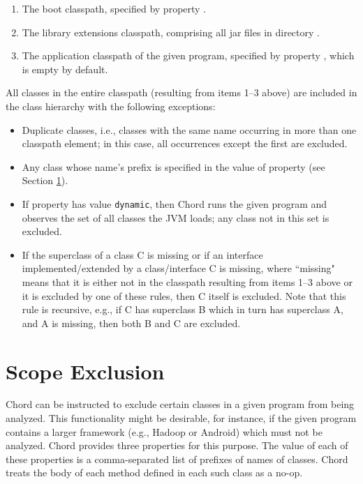 \begin{enumerate}
\item
The boot classpath, specified by property .
\item
The library extensions classpath, comprising all jar files in
directory .
\item
The application classpath of the given program, specified by property ,
which is empty by default.
\end{enumerate}

All classes in the entire classpath (resulting from items 1--3 above)
are included in the class hierarchy with the following exceptions:
\begin{itemize}
\item
Duplicate classes, i.e., classes with the same name occurring in more
than one classpath element; in this case, all occurrences except the
first are excluded.
\item
Any class whose name's prefix is specified in the value of property
 (see Section \ref{sec:scope-exclude}).
\item
If property  has value {\tt dynamic}, then
Chord runs the given program and observes the set of all classes the
JVM loads; any class not in this set is excluded.
\item
If the superclass of a class C is missing or if an interface
implemented/extended by a class/interface C is missing, where
``missing" means that it is either not in the classpath resulting from
items 1--3 above or it is excluded by one of these rules, then C
itself is excluded.  Note that this rule is recursive, e.g., if C has
superclass B which in turn has superclass A, and A is missing, then
both B and C are excluded.
\end{itemize}

\section{Scope Exclusion}
\label{sec:scope-exclude}

Chord can be instructed to exclude certain classes in a given program 
from being analyzed.
This functionality might be desirable, for instance, if the given program
contains a larger framework (e.g., Hadoop or Android) which
must not be analyzed.
Chord provides three properties for this purpose.
The value of each of these properties is a comma-separated list of prefixes
of names of classes.  Chord treats the body of each method defined in
each such class as a no-op.

